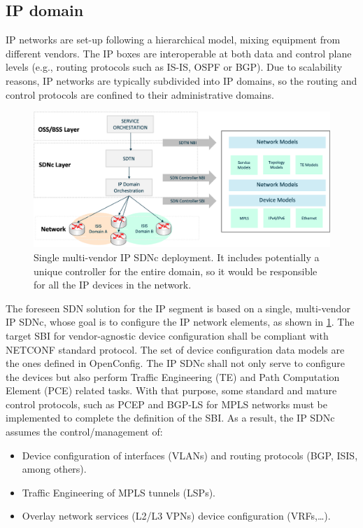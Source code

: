 \documentclass[a4paper,fleqn]{cas-dc}
\begin{document}
\subsection {IP domain}
\label{section:ip}
IP networks are set-up following a hierarchical model, mixing equipment from different vendors. The IP boxes are interoperable at both data and control plane levels (e.g., routing protocols such as IS-IS, OSPF or BGP). Due to scalability reasons, IP networks are typically subdivided into IP domains, so the routing and control protocols are confined to their administrative domains.

\begin{figure}
	\centering
		\includegraphics[scale=0.5]{figs/ifusion_multidomain_2.png}
	\caption{Single multi-vendor IP SDNc deployment. It includes potentially a unique controller for the entire domain, so it would be responsible for all the IP devices in the network.}
	\label{FIG:2}
\end{figure}

The foreseen SDN solution for the IP segment is based on a single, multi-vendor IP SDNc, whose goal is to configure the IP network elements, as shown in \cref{FIG:2}. The target SBI for vendor-agnostic device configuration shall be compliant with NETCONF standard protocol. The set of device configuration data models are the ones defined in OpenConfig. 
The IP SDNc shall not only serve to configure the devices but also perform Traffic Engineering (TE) and Path Computation Element (PCE) related tasks. With that purpose, some standard and mature control protocols, such as PCEP and BGP-LS for MPLS networks must be implemented to complete the definition of the SBI. As a result, the IP SDNc assumes the control/management of:
\begin{itemize}
\item Device configuration of interfaces (VLANs) and routing protocols (BGP, ISIS, among others).
\item Traffic Engineering of MPLS tunnels (LSPs). 
\item Overlay network services (L2/L3 VPNs) device configuration (VRFs,\dots).
\end{itemize}
\end{document}
